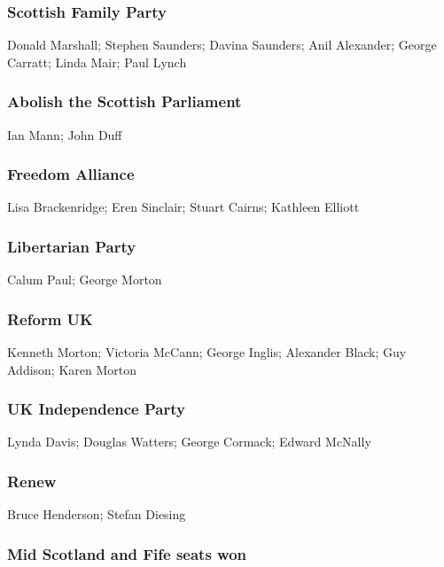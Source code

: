 \begin{resultsiii}
\subsubsection*{Scottish Family Party}
Donald Marshall; Stephen Saunders; Davina Saunders; Anil Alexander; George Carratt; Linda Mair; Paul Lynch

\subsubsection*{Abolish the Scottish Parliament}
Ian Mann; John Duff

\subsubsection*{Freedom Alliance}
Lisa Brackenridge; Eren Sinclair; Stuart Cairns; Kathleen Elliott

\subsubsection*{Libertarian Party}
Calum Paul; George Morton

\subsubsection*{Reform UK}
Kenneth Morton; Victoria McCann; George Inglis; Alexander Black; Guy Addison; Karen Morton

\subsubsection*{UK Independence Party}
Lynda Davis; Douglas Watters; George Cormack; Edward McNally

\subsubsection*{Renew}
Bruce Henderson; Stefan Diesing
\end{resultsiii}

\vfill\eject

\subsubsection*{Mid Scotland and Fife seats won}

